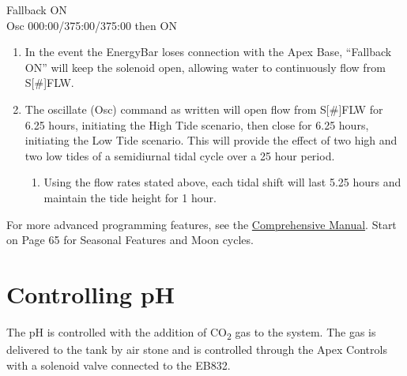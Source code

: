 \documentclass[
]{book}
\providecommand{\tightlist}{%
  \setlength{\itemsep}{0pt}\setlength{\parskip}{0pt}}
\begin{document}
Fallback ON\\
Osc 000:00/375:00/375:00 then ON

\begin{enumerate}
\def\labelenumi{\arabic{enumi}.}
\tightlist
\item
  In the event the EnergyBar loses connection with the Apex Base, ``Fallback ON'' will keep the solenoid open, allowing water to continuously flow from S{[}\#{]}FLW.\\
\item
  The oscillate (Osc) command as written will open flow from S{[}\#{]}FLW for 6.25 hours, initiating the High Tide scenario, then close for 6.25 hours, initiating the Low Tide scenario. This will provide the effect of two high and two low tides of a semidiurnal tidal cycle over a 25 hour period.

  \begin{enumerate}
  \def\labelenumii{\arabic{enumii}.}
  \tightlist
  \item
    Using the flow rates stated above, each tidal shift will last 5.25 hours and maintain the tide height for 1 hour.
  \end{enumerate}
\end{enumerate}

For more advanced programming features, see the \href{https://github.com/SilbigerLab/Mesocosm_User_Manual/tree/7503b88686aef920c4a4ed473b1efe37b34dae10/Manuals/Apex_Comprehensive_Reference_Manual.pdf}{Comprehensive Manual}. Start on Page 65 for Seasonal Features and Moon cycles.

\hypertarget{controlling-ph}{%
\chapter{Controlling pH}\label{controlling-ph}}

The pH is controlled with the addition of CO\textsubscript{2} gas to the system. The gas is delivered to the tank by air stone and is controlled through the Apex Controls with a solenoid valve connected to the EB832.
\end{document}
